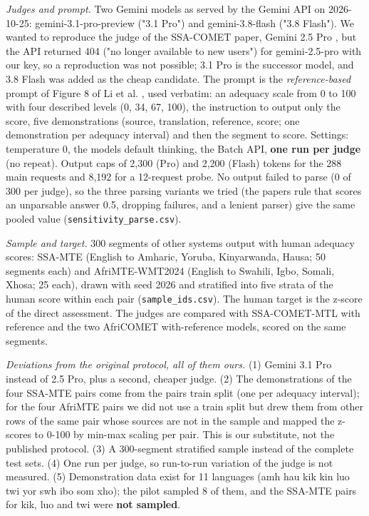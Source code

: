 \emph{Judges and prompt.} Two Gemini models as served by the Gemini API on 2026-10-25: gemini-3.1-pro-preview ("3.1 Pro") and gemini-3.8-flash ("3.8 Flash"). We wanted to reproduce the judge of the SSA-COMET paper, Gemini 2.5 Pro \citep{li2025ssacomet}, but the API returned 404 ("no longer available to new users") for gemini-2.5-pro with our key, so a reproduction was not possible; 3.1 Pro is the successor model, and 3.8 Flash was added as the cheap candidate. The prompt is the \emph{reference-based} prompt of Figure 8 of Li et al. \citep{li2025ssacomet}, used verbatim: an adequacy scale from 0 to 100 with four described levels (0, 34, 67, 100), the instruction to output only the score, five demonstrations (source, translation, reference, score; one demonstration per adequacy interval) and then the segment to score. Settings: temperature 0, the model\textquotesingle s default thinking, the Batch API, \textbf{one run per judge} (no repeat). Output caps of 2,300 (Pro) and 2,200 (Flash) tokens for the 288 main requests and 8,192 for a 12-request probe. No output failed to parse (0 of 300 per judge), so the three parsing variants we tried (the paper\textquotesingle s rule that scores an unparsable answer 0.5, dropping failures, and a lenient parser) give the same pooled value (\texttt{sensitivity\_parse.csv}).

\emph{Sample and target.} 300 segments of other systems\textquotesingle{} output with human adequacy scores: SSA-MTE (English to Amharic, Yoruba, Kinyarwanda, Hausa; 50 segments each) and AfriMTE-WMT2024 (English to Swahili, Igbo, Somali, Xhosa; 25 each), drawn with seed 2026 and stratified into five strata of the human score within each pair (\texttt{sample\_ids.csv}). The human target is the z-score of the direct assessment. The judges are compared with SSA-COMET-MTL with reference and the two AfriCOMET with-reference models, scored on the same segments.

\emph{Deviations from the original protocol, all of them ours.} (1) Gemini 3.1 Pro instead of 2.5 Pro, plus a second, cheaper judge. (2) The demonstrations of the four SSA-MTE pairs come from the pair\textquotesingle s train split (one per adequacy interval); for the four AfriMTE pairs we did not use a train split but drew them from other rows of the same pair whose sources are not in the sample and mapped the z-scores to 0-100 by min-max scaling per pair. This is our substitute, not the published protocol. (3) A 300-segment stratified sample instead of the complete test sets. (4) One run per judge, so run-to-run variation of the judge is not measured. (5) Demonstration data exist for 11 languages (amh hau kik kin luo twi yor swh ibo som xho); the pilot sampled 8 of them, and the SSA-MTE pairs for kik, luo and twi were \textbf{not sampled}.

